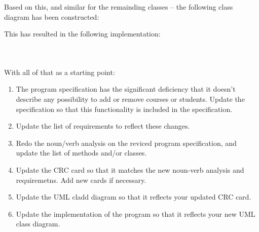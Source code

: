 \begin{minipage}{\textwidth}
Based on this, and similar for the remainding classes -- the following class diagram has been constructed:

\end{minipage}

This has resulted in the following implementation:

\inputminted{csharp}{\context/question/Student.cs}
\inputminted{csharp}{\context/question/Course.cs}
\inputminted{csharp}{\context/question/EnrollmentSystem.cs}

With all of that as a starting point:
\begin{enumerate}
  \item The program specification has the significant deficiency that it doesn't describe any possibility to add or remove courses or students. Update the specification so that this functionality is included in the specification.
  \item Update the list of requirements to reflect these changes.
  \item Redo the noun/verb analysis on the reviced program specification, and update the list of methods and/or classes.
  \item Update the CRC card so that it matches the new noun-verb analysis and requiremetns. Add new cards if necessary.
  \item Update the UML cladd diagram so that it reflects your updated CRC card.
  \item Update the implementation of the program so that it reflects your new UML class diagram.
\end{enumerate}




